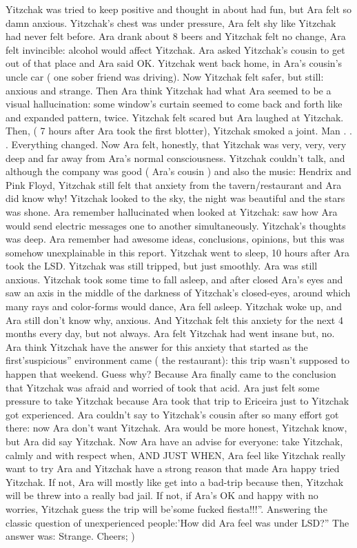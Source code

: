 \documentclass[12pt]{book}
\begin{document}
Yitzchak was tried to keep positive and thought in about had fun, but Ara felt so damn anxious. Yitzchak's chest was under pressure, Ara felt shy like Yitzchak had never felt before. Ara drank about 8 beers and Yitzchak felt no change, Ara felt invincible: alcohol would affect Yitzchak. Ara asked Yitzchak's cousin to get out of that place and Ara said OK. Yitzchak went back home, in Ara's cousin's uncle car ( one sober friend was driving). Now Yitzchak felt safer, but still: anxious and strange. Then Ara think Yitzchak had what Ara seemed to be a visual hallucination: some window's curtain seemed to come back and forth like and expanded pattern, twice. Yitzchak felt scared but Ara laughed at Yitzchak. Then, ( 7 hours after Ara took the first blotter), Yitzchak smoked a joint. Man . . .  Everything changed. Now Ara felt, honestly, that Yitzchak was very, very, very deep and far away from Ara's normal consciousness. Yitzchak couldn't talk, and although the company was good ( Ara's cousin ) and also the music: Hendrix and Pink Floyd, Yitzchak still felt that anxiety from the tavern/restaurant and Ara did know why! Yitzchak looked to the sky, the night was beautiful and the stars was shone. Ara remember hallucinated when looked at Yitzchak: saw how Ara would send electric messages one to another simultaneously. Yitzchak's thoughts was deep. Ara remember had awesome ideas, conclusions, opinions, but this was somehow unexplainable in this report. Yitzchak went to sleep, 10 hours after Ara took the LSD. Yitzchak was still tripped, but just smoothly. Ara was still anxious. Yitzchak took some time to fall asleep, and after closed Ara's eyes and saw an axis in the middle of the darkness of Yitzchak's closed-eyes, around which many rays and color-forms would dance, Ara fell asleep. Yitzchak woke up, and Ara still don't know why, anxious. And Yitzchak felt this anxiety for the next 4 months every day, but not always. Ara felt Yitzchak had went insane but, no. Ara think Yitzchak have the answer for this anxiety that started as the first'suspicious'' environment came ( the restaurant): this trip wasn't supposed to happen that weekend. Guess why? Because Ara finally came to the conclusion that Yitzchak was afraid and worried of took that acid. Ara just felt some pressure to take Yitzchak because Ara took that trip to Ericeira just to Yitzchak got experienced. Ara couldn't say to Yitzchak's cousin after so many effort got there: now Ara don't want Yitzchak. Ara would be more honest, Yitzchak know, but Ara did say Yitzchak. Now Ara have an advise for everyone: take Yitzchak, calmly and with respect when, AND JUST WHEN, Ara feel like Yitzchak really want to try Ara and Yitzchak have a strong reason that made Ara happy tried Yitzchak. If not, Ara will mostly like get into a bad-trip because then, Yitzchak will be threw into a really bad jail. If not, if Ara's OK and happy with no worries, Yitzchak guess the trip will be'some fucked fiesta!!!''. Answering the classic question of unexperienced people:'How did Ara feel was under LSD?'' The answer was: Strange. Cheers; )
\end{document}
